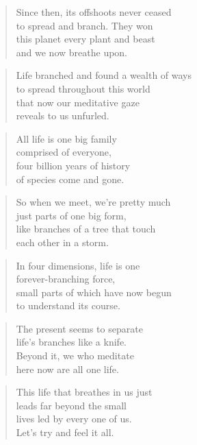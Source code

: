 \documentclass[10pt,a4paper]{article}
\begin{document}
\begin{paracol}{2}
\begin{verse}
Since then, its offshoots never ceased\\
to spread and branch. They won\\
this planet every plant and beast\\
and we now breathe upon.
\end{verse}

\begin{verse}
Life branched and found a wealth of ways\\
to spread throughout this world\\
that now our meditative gaze\\
reveals to us unfurled.
\end{verse}

\begin{verse}
All life is one big family\\
comprised of everyone,\\
four billion years of history\\
of species come and gone.
\end{verse}

\begin{verse}
So when we meet, we’re pretty much\\
just parts of one big form,\\
like branches of a tree that touch\\
each other in a storm.
\end{verse}

\begin{verse}
In four dimensions, life is one\\
forever-branching force,\\
small parts of which have now begun\\
to understand its course.
\end{verse}

\begin{verse}
The present seems to separate\\
life’s branches like a knife.\\
Beyond it, we who meditate\\
here now are all one life.
\end{verse}

\begin{verse}
This life that breathes in us just\\
leads far beyond the small\\
lives led by every one of us.\\
Let’s try and feel it all.
\end{verse}


\end{paracol}
\end{document}
